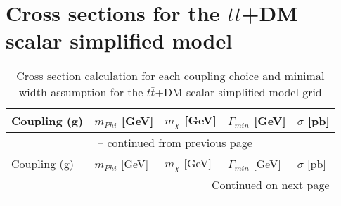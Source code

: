 \section{Cross sections for the $t\bar t$+DM scalar simplified model}

\begin{longtable}{lllll}
	\caption{Cross section calculation for each coupling choice and minimal width assumption for the $t\bar t$+DM scalar simplified model grid}\\
	\toprule
	Coupling (g) & $m_{Phi}$ [GeV] & $m_{\chi}$ [GeV] & $\Gamma_{min}$ [GeV] & $\sigma$ [pb]\\
	\midrule
	\endfirsthead
	
	\multicolumn{5}{c}{\tablename\ \thetable{} -- continued from previous page} \\
	Coupling (g) & $m_{Phi}$ [GeV] & $m_{\chi}$ [GeV] & $\Gamma_{min}$ [GeV] & $\sigma$ [pb]\\
	\midrule
	\endhead
	
	\midrule
	\multicolumn{5}{r}{{Continued on next page}} \\ 
	\endfoot
	

\end{longtable}
